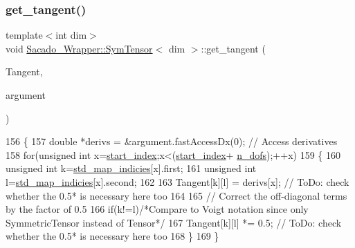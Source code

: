 \subsubsection{\texorpdfstring{get\+\_\+tangent()}{get\_tangent()}\hspace{0.1cm}{\footnotesize\ttfamily [2/2]}}
{\footnotesize\ttfamily template$<$int dim$>$ \\
void \hyperlink{classSacado__Wrapper_1_1SymTensor}{Sacado\+\_\+\+Wrapper\+::\+Sym\+Tensor}$<$ dim $>$\+::get\+\_\+tangent (\begin{DoxyParamCaption}\item[{Symmetric\+Tensor$<$ 2, dim $>$ \&}]{Tangent,  }\item[{\hyperlink{Sacado-auxiliary__functions_8h_a868b94676739e612d9c95940e70892a9}{fad\+\_\+double} \&}]{argument }\end{DoxyParamCaption})}


\begin{DoxyCode}
156     \{
157         \textcolor{keywordtype}{double} *derivs = &argument.fastAccessDx(0); \textcolor{comment}{// Access derivatives}
158         \textcolor{keywordflow}{for}(\textcolor{keywordtype}{unsigned} \textcolor{keywordtype}{int} x=\hyperlink{classSacado__Wrapper_1_1SymTensor_afe921e6044e4110fcfc848c52844d650}{start\_index};x<(\hyperlink{classSacado__Wrapper_1_1SymTensor_afe921e6044e4110fcfc848c52844d650}{start\_index}+
      \hyperlink{classSacado__Wrapper_1_1SymTensor_a733bc4b029ff8d067b48e7ce3ee7606b}{n\_dofs});++x)
159         \{
160             \textcolor{keywordtype}{unsigned} \textcolor{keywordtype}{int} k=\hyperlink{classSacado__Wrapper_1_1SymTensor_ae3b1c56cde3fc5c7805b618ef3d9de75}{std\_map\_indicies}[x].first;
161             \textcolor{keywordtype}{unsigned} \textcolor{keywordtype}{int} l=\hyperlink{classSacado__Wrapper_1_1SymTensor_ae3b1c56cde3fc5c7805b618ef3d9de75}{std\_map\_indicies}[x].second;
162 
163             Tangent[k][l] = derivs[x]; \textcolor{comment}{// ToDo: check whether the 0.5* is necessary here too}
164 
165             \textcolor{comment}{// Correct the off-diagonal terms by the factor of 0.5}
166              \textcolor{keywordflow}{if}(k!=l)\textcolor{comment}{/*Compare to Voigt notation since only SymmetricTensor instead of Tensor*/}
167                 Tangent[k][l] *= 0.5; \textcolor{comment}{// ToDo: check whether the 0.5* is necessary here too}
168         \}
169     \}
\end{DoxyCode}
\mbox{\label{classSacado__Wrapper_1_1SymTensor_ade8f6c8cb25c2b6e2baac06ef638c293}} 
